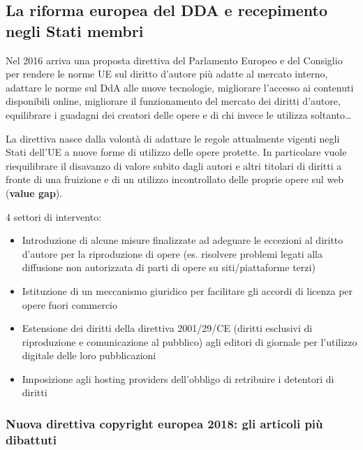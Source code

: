 \subsection{La riforma europea del DDA e recepimento negli Stati membri}

Nel 2016 arriva una proposta direttiva del Parlamento Europeo e del Consiglio per rendere le norme UE sul diritto d'autore più adatte al mercato interno, adattare le norme sul DdA alle nuove tecnologie, migliorare l'accesso ai contenuti disponibili online, migliorare il funzionamento del mercato dei diritti d'autore, equilibrare i guadagni dei creatori delle opere e di chi invece le utilizza soltanto…

La direttiva nasce dalla volontà di adattare le regole attualmente vigenti negli Stati dell'UE a nuove forme di utilizzo delle opere protette.  In particolare vuole riequilibrare il disavanzo di valore subito dagli autori e altri titolari di diritti a fronte di una fruizione e di un utilizzo incontrollato delle proprie opere sul web (\textbf{value gap}).

4 settori di intervento:
\begin{itemize}
    \item Introduzione di alcune misure finalizzate ad adeguare le eccezioni al diritto d'autore per la riproduzione di opere (es. risolvere problemi legati alla diffusione non autorizzata di parti di opere su siti/piattaforme terzi)
    \item Istituzione di un meccanismo giuridico per facilitare gli accordi di licenza per opere fuori commercio
    \item Estensione dei diritti della direttiva 2001/29/CE (diritti esclusivi di riproduzione e comunicazione al pubblico) agli editori di giornale per l'utilizzo digitale delle loro pubblicazioni 
    \item Imposizione agli hosting providers dell'obbligo di retribuire i detentori di diritti
\end{itemize}

\subsubsection{Nuova direttiva copyright europea 2018: gli articoli più dibattuti}

